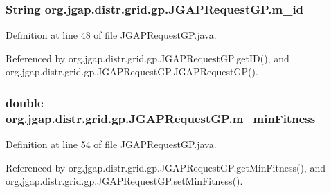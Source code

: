 \hypertarget{classorg_1_1jgap_1_1distr_1_1grid_1_1gp_1_1_j_g_a_p_request_g_p_a05d61a2d16680fbb070e2d8cacf881fc}{
\subsubsection[{m\-\_\-id}]{\setlength{\rightskip}{0pt plus 5cm}String org.\-jgap.\-distr.\-grid.\-gp.\-J\-G\-A\-P\-Request\-G\-P.\-m\-\_\-id\hspace{0.3cm}{\ttfamily [private]}}}\label{classorg_1_1jgap_1_1distr_1_1grid_1_1gp_1_1_j_g_a_p_request_g_p_a05d61a2d16680fbb070e2d8cacf881fc}


Definition at line 48 of file J\-G\-A\-P\-Request\-G\-P.\-java.



Referenced by org.\-jgap.\-distr.\-grid.\-gp.\-J\-G\-A\-P\-Request\-G\-P.\-get\-I\-D(), and org.\-jgap.\-distr.\-grid.\-gp.\-J\-G\-A\-P\-Request\-G\-P.\-J\-G\-A\-P\-Request\-G\-P().

\hypertarget{classorg_1_1jgap_1_1distr_1_1grid_1_1gp_1_1_j_g_a_p_request_g_p_a0b3c6c24906fb1af0a86f0afdd4b4a47}{
\subsubsection[{m\-\_\-min\-Fitness}]{\setlength{\rightskip}{0pt plus 5cm}double org.\-jgap.\-distr.\-grid.\-gp.\-J\-G\-A\-P\-Request\-G\-P.\-m\-\_\-min\-Fitness\hspace{0.3cm}{\ttfamily [private]}}}\label{classorg_1_1jgap_1_1distr_1_1grid_1_1gp_1_1_j_g_a_p_request_g_p_a0b3c6c24906fb1af0a86f0afdd4b4a47}


Definition at line 54 of file J\-G\-A\-P\-Request\-G\-P.\-java.



Referenced by org.\-jgap.\-distr.\-grid.\-gp.\-J\-G\-A\-P\-Request\-G\-P.\-get\-Min\-Fitness(), and org.\-jgap.\-distr.\-grid.\-gp.\-J\-G\-A\-P\-Request\-G\-P.\-set\-Min\-Fitness().

